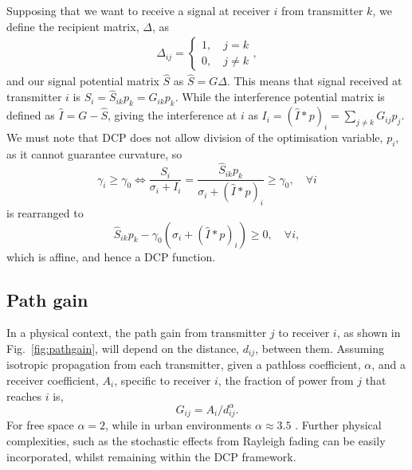 \documentclass[twocolumn,secnumarabic,amssymb, nobibnotes, aps, prl,superscriptaddress]{revtex4-1}
\begin{document}
Supposing that we want to receive a signal at receiver $i$ from transmitter $k$, we define the recipient matrix, $\Delta$, as
\begin{align*}
\Delta_{ij} = \begin{cases}
1, \quad j=k\\
0, \quad j\neq k
\end{cases},
\end{align*}
and our signal potential matrix $\hat{S}$ as $\hat{S} = G\Delta$.  This means that signal received at transmitter $i$ is $S_i = \hat{S}_{ik}p_k = G_{ik}p_k$.
While the interference potential matrix is defined as $\hat{I} = G-\hat{S}$, giving the interference at $i$ as $I_i = (\hat{I}*p)_i = \sum_{j\neq k}G_{ij}p_j$. We must note that DCP does not allow division of the optimisation variable, $p_i$, as it cannot guarantee curvature, so  
\begin{equation*}
  \gamma_i \geqslant \gamma_0\Longleftrightarrow  \frac{S_i}{\sigma_i + I_i} = \frac{\hat{S}_{ik}p_k}{\sigma_i+(\hat{I}*p)_i} \geqslant \gamma_0, \quad \forall i
\end{equation*}
is rearranged to
\begin{equation*}
\hat{S}_{ik}p_k-\gamma_0(\sigma_i + (\hat{I}*p)_i)\geqslant 0, \quad \forall i,
\end{equation*} 
which is affine, and hence a DCP function.

\subsection{Path gain}
\noindent In a physical context, the path gain from transmitter $j$ to receiver $i$, as shown in Fig.~\ref{fig:pathgain}, will depend on the distance, $d_{ij}$, between them. Assuming isotropic propagation from each transmitter, given a pathloss coefficient, $\alpha$, and a receiver coefficient, $A_i$, specific to receiver $i$, the fraction of power from $j$ that reaches $i$ is,
\begin{equation}
G_{ij} = A_i/d_{ij}^\alpha.
\end{equation}
For free space $\alpha = 2$, while in urban environments $\alpha \approx 3.5$ \cite{hata1980}. Further physical complexities, such as the stochastic effects from Rayleigh fading can be easily incorporated, whilst remaining within the DCP framework.
\end{document}
